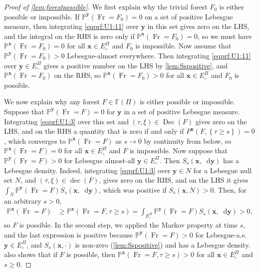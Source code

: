 \documentclass[reqno,draft]{amsart}
\numberwithin{equation}{section}
\theoremstyle{plain}
\theoremstyle{remark}
\renewcommand{\P}{\mathbb{P}} %
\newcommand*\diff{\mathop{}\!\mathrm{d}}
\newcommand{\fpart}{\Pi} %
\DeclareMathOperator{\dcb}{dec}
\newcommand{\semi}{S}
\DeclareMathOperator{\fr}{Fr}
\DeclareMathOperator{\dc}{Dec}
\newcommand{\nn}{\widetilde{N}} %
\begin{document}
\begin{proof}[Proof of \cref{lem:forestpossible}]
    We first explain why the trivial forest $F_0$ is either possible or impossible. If $\P^{\boldsymbol y}(\fr = F_0) = 0$ on a set of positive Lebesgue measure, then integrating \cref{eqprf:U1:11} over $\boldsymbol y$ in this set gives zero on the LHS, and the integral on the RHS is zero only if $\P^{\boldsymbol x}(\fr = F_0) = 0$, so we must have $\P^{\boldsymbol x}(\fr = F_0) = 0$ for all $\boldsymbol x\in E^\fpart_\circ $ and $F_0$ is impossible. Now assume that $\P^{\boldsymbol y}(\fr = F_0) > 0$ Lebesgue-almost everywhere. Then integrating \cref{eqprf:U1:11} over $\boldsymbol y\in E^\fpart_\circ $ gives a positive number on the LHS by \cref{lem:Sspositive}, and $\P^{\boldsymbol x}(\fr = F_0)$ on the RHS, so $\P^{\boldsymbol x}(\fr = F_0) > 0$ for all $\boldsymbol x\in E^\fpart_\circ $ and $F_0$ is possible.  %

    We now explain why any forest $F\in \mathbb{F}(\fpart)$ is either possible or impossible. Suppose that $\P^{\boldsymbol y}(\fr = F) = 0$ for $\boldsymbol y$ in a set of positive Lebesgue measure. Integrating \eqref{eqprf:U1:3} over this set and $(\tau,\xi) \in \dc(F)$ gives zero on the LHS, and on the RHS a quantity that is zero if and only if $P^{\boldsymbol x}(F, \left\{ \tau \ge s \right\} ) = 0$, which converges to $\P^{\boldsymbol x}(\fr = F)$ as $s \to 0 $ by continuity from below, so $\P^{\boldsymbol x}(\fr = F) = 0$ for all $\boldsymbol x\in E^\fpart_\circ $ and $F$ is impossible. Now suppose that $\P^{\boldsymbol y}(\fr = F) > 0$ for Lebesgue almost-all $\boldsymbol y\in E^\fpart_\circ $. Then $\semi_s(\boldsymbol x,\diff \boldsymbol y)$ has a Lebesgue density. Indeed, integrating \cref{eqprf:U1:3} over $\boldsymbol y\in N$ for a Lebesgue null set $N$, and $(\tau,\xi) \in \dcb(F)$, gives zero on the RHS, and on the LHS it gives $\int_N \P^{\boldsymbol y}(\fr = F) \semi_s(\boldsymbol x,\diff \boldsymbol y)$, which was positive if $\semi_s(\boldsymbol x,N) > 0$. Then, for an arbitrary $s > 0$,
    \begin{align}\label{eqprf:U1:50}
        \P^{\boldsymbol x}(\fr = F)
        &\ge \P^{\boldsymbol x}(\fr = F, \tau \ge s)
        = \int_{E^\fpart_\circ } \P^{\boldsymbol y}(\fr = F) \semi_s(\boldsymbol x,\diff \boldsymbol y) > 0,
    \end{align}
    so $F$ is possible. In the second step, we applied the Markov property at time $s$, and the last expression is positive because $\P^{\boldsymbol y}(\fr = F) > 0$ for Lebesgue-a.e.\ $\boldsymbol y\in E^\fpart_\circ $, and $\semi_s(\boldsymbol x,\cdot )$ is non-zero (\cref{lem:Sspositive}) and has a Lebesgue density.  also shows that if $F$ is possible, then $\P^{\boldsymbol x}(\fr = F, \tau \ge s) > 0$ for all $\boldsymbol x\in E^\fpart_\circ $ and $s \ge 0$.
\end{proof}
\end{document}
